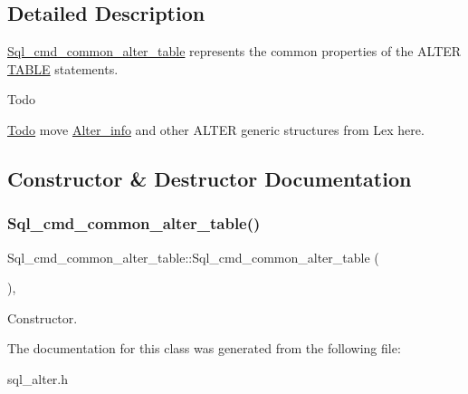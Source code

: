 \subsection{Detailed Description}
\mbox{\hyperlink{classSql__cmd__common__alter__table}{Sql\+\_\+cmd\+\_\+common\+\_\+alter\+\_\+table}} represents the common properties of the A\+L\+T\+ER \mbox{\hyperlink{structTABLE}{T\+A\+B\+LE}} statements. \begin{DoxyRefDesc}{Todo}
\item[\mbox{\hyperlink{todo__todo000074}{Todo}}]move \mbox{\hyperlink{classAlter__info}{Alter\+\_\+info}} and other A\+L\+T\+ER generic structures from Lex here. \end{DoxyRefDesc}


\subsection{Constructor \& Destructor Documentation}
\mbox{\label{classSql__cmd__common__alter__table_a0bb60d8f132da6bb4c6a534c8f971736}} 
\subsubsection{\texorpdfstring{Sql\+\_\+cmd\+\_\+common\+\_\+alter\+\_\+table()}{Sql\_cmd\_common\_alter\_table()}}
{\footnotesize\ttfamily Sql\+\_\+cmd\+\_\+common\+\_\+alter\+\_\+table\+::\+Sql\+\_\+cmd\+\_\+common\+\_\+alter\+\_\+table (\begin{DoxyParamCaption}{ }\end{DoxyParamCaption})\hspace{0.3cm}{\ttfamily [inline]}, {\ttfamily [protected]}}

Constructor. 

The documentation for this class was generated from the following file\+:\begin{DoxyCompactItemize}
\item 
sql\+\_\+alter.\+h\end{DoxyCompactItemize}
